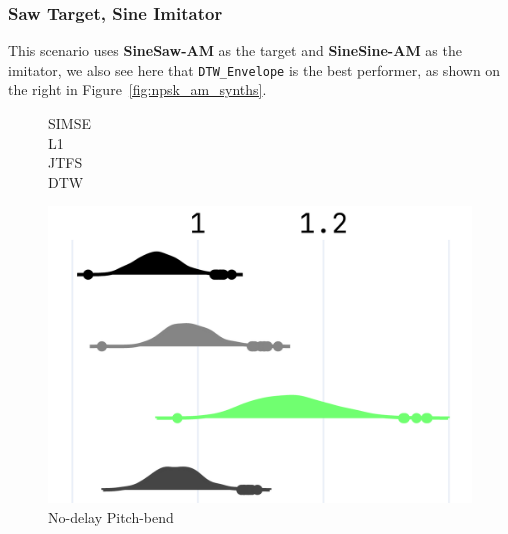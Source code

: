 \documentclass{article} %
\newcommand{\DTWEnv}{\texttt{DTW\_Envelope}\xspace}
\newcommand{\FMMod}{\textbf{SineSaw-AM}\xspace}
\newcommand{\FMModvtwo}{\textbf{SineSine-AM}\xspace}
\begin{document}
\subsubsection{Saw Target, Sine Imitator}
\label{sec:am_sawtarget_sineimitate}
This scenario uses \FMMod as the target and \FMModvtwo as the imitator, we also see here that \DTWEnv is the best performer, as shown on the right in Figure~\ref{fig:npsk_am_synths}.



\begin{figure}[t]
  \centering
  \begin{minipage}[t]{\textwidth}
    \begin{minipage}[t]{0.045\textwidth}
      \footnotesize\raggedleft
      \vspace{-3cm} %
      SIMSE\\[0.4cm]
      L1\\[0.385cm]
      JTFS\\[0.365cm]
      DTW
    \end{minipage}%
    \hspace{0.01\textwidth}%
    \begin{minipage}[t]{0.91\textwidth}
      \centering
      \begin{minipage}[t]{0.31\textwidth}
        \centering
        \includegraphics[width=\linewidth]{images/npsk_ood_P_Loss_6.png}
        \vspace{0.3em}
        \footnotesize No-delay Pitch-bend
      \end{minipage}
      \hspace{0.015\textwidth}%

\end{minipage}
\end{minipage}
\end{figure}
\end{document}

